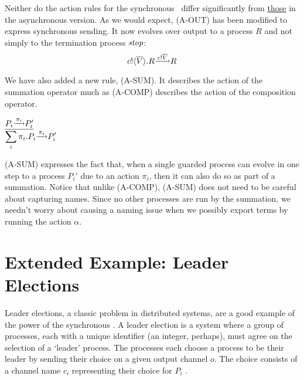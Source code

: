 Neither do the action rules for the synchronous \picalc\ differ significantly from \hyperref[apiactionrules]{those} in the asynchronous version.  
As we would expect, (A-OUT) has been modified to express synchronous sending. 
It now evolves over output to a process $R$ and not simply to the termination process $\mbox{\emph{stop}}$:
\[
	{c}!\langle{ \ensuremath{\overline{V}} }\rangle.R \overset{\underrightarrow{\ { \ensuremath{{c}!{\overline{V}}} }\ }}{} R	
\]

We have also added a new rule, (A-SUM). It describes the action of the summation operator much as (A-COMP) describes the action of the composition operator.
\begin{center}
	$\underline{P_i \overset{\underrightarrow{\ {\pi_i}\ }}{} P_i'}$\\
	$\displaystyle\sum_{i}\pi_i.P_i \overset{\underrightarrow{\ {\pi_i}\ }}{} P_i'$\\
\end{center}
(A-SUM) expresses the fact that, when a single guarded process can evolve in one step to a process $P_i'$ due to an action $\pi_i$, then it can also do so as part of a summation.
Notice that unlike (A-COMP), (A-SUM) does not need to be careful about capturing names. 
Since no other processes are run by the summation, we needn't worry about causing a naming issue when we possibly export terms by running the action $\alpha$.

\section{Extended Example: Leader Elections}\label{secleaderelecs}
Leader elections, a classic problem in distributed systems, are a good example of the power of the synchronous \picalc.
A leader election is a system where a group of processes, each with a unique identifier (an integer, perhaps), must agree on the selection of a `leader' process.
The processes each choose a process to be their leader by sending their choice on a given output channel $o$.   
The choice consists of a channel name $c_i$ representing their choice for $P_i$ .  

